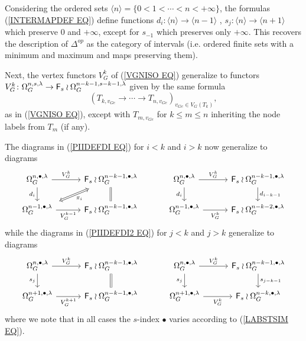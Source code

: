 \documentclass[a4paper,10pt]{article}%
\begin{document}
\begin{remark}\label{ORDLABEL REM}
Considering the ordered sets 
$\langle n \rangle =\{0 < 1 < \cdots < n < +\infty\}$, the formulas (\ref{INTERMAPDEF EQ}) 
define functions
$d_i \colon \langle n \rangle  \to \langle n-1 \rangle$
,
$s_j \colon \langle n \rangle  \to \langle n+1 \rangle$
which preserve $0$ and $+\infty$, except for 
$s_{-1}$ which preserves only
$+\infty$.
This recovers the description of $\Delta^{op}$
as the category of intervals (i.e. ordered finite sets with a minimum and maximum and maps preserving them).
\end{remark}


Next, the vertex functors $V_G^k$ of
(\ref{VGNISO EQ}) generalize to functors
$
	V_G^k \colon
	\Omega_G^{n,s,\lambda} \to
	\mathsf{F}_s \wr \Omega_G^{n-k-1,s-k-1,\lambda}
$
given by the same formula
\[
	(T_{k,v_{G e}}\to \cdots \to T_{n,v_{G e}})_{v_{G e} \in V_G(T_k)},
\]
as in (\ref{VGNISO EQ}),
except with $T_{m,v_{G e}}$ for $k \leq m \leq n$ inheriting the node labels from $T_m$ (if any).

The diagrams in (\ref{PIIDEFDI EQ})
for $i<k$ and $i>k$ now generalize to diagrams
\begin{equation}\label{PIIDEFDILAB EQ}
\begin{tikzcd}[row sep=1.7em,column sep = 3em]
	\Omega_{G}^{n,\bullet,\lambda} \ar{d}[swap]{d_{i}} \ar{r}{V_G^k} &
	|[alias=F1]|
	\Fin_s \wr \Omega_{G}^{n-k-1,\bullet,\lambda}
	\ar[equal]{d} 
&
	\Omega_{G}^{n,\bullet,\lambda} \ar{d}[swap]{d_{i}} \ar{r}{V_G^k} &
	\Fin_s \wr \Omega_{G}^{n-k-1,\bullet,\lambda}
	\ar{d}{d_{i-k-1}} 
\\
	|[alias=G2]|
	\Omega_{G}^{n-1,\bullet,\lambda} \ar{r}[swap]{V_G^{k-1}}&
	\Fin_s \wr \Omega_{G}^{n-k-1,\bullet,\lambda}  
&
	\Omega_{G}^{n-1,\bullet,\lambda} \ar{r}[swap]{V_G^{k}}&
	\Fin_s \wr \Omega_{G}^{n-k-2,\bullet,\lambda}  
\arrow[Leftrightarrow, from=F1, to=G2,shorten >=0.15cm,shorten <=0.15cm,"\pi_{i}"]
\end{tikzcd}
\end{equation}
while the diagrams in (\ref{PIIDEFDI2 EQ})
for $j<k$ and $j>k$ generalize to diagrams
\begin{equation}\label{PIIDEFDI2LAB EQ}
\begin{tikzcd}[row sep=1.7em,column sep = 3em]
	\Omega_{G}^{n,\bullet,\lambda} \ar{d}[swap]{s_{j}} \ar{r}{V_G^k} &
	|[alias=F1]|
	\Fin_s \wr \Omega_{G}^{n-k-1,\bullet,\lambda}
	\ar[equal]{d} 
&
	\Omega_{G}^{n,\bullet,\lambda} \ar{d}[swap]{s_{j}} \ar{r}{V_G^k} &
	\Fin_s \wr \Omega_{G}^{n-k-1,\bullet,\lambda}
	\ar{d}{s_{j-k-1}} 
\\
	|[alias=G2]|
	\Omega_{G}^{n+1,\bullet,\lambda} \ar{r}[swap]{V_G^{k+1}}&
	\Fin_s \wr \Omega_{G}^{n-k-1,\bullet, \lambda}  
&
	\Omega_{G}^{n+1,\bullet, \lambda} \ar{r}[swap]{V_G^{k}}&
	\Fin_s \wr \Omega_{G}^{n-k,\bullet,\lambda}  
\end{tikzcd}
\end{equation}
where we note that in all cases the $s$-index $\bullet$
varies according to (\ref{LABSTSIM EQ}).
\end{document}
